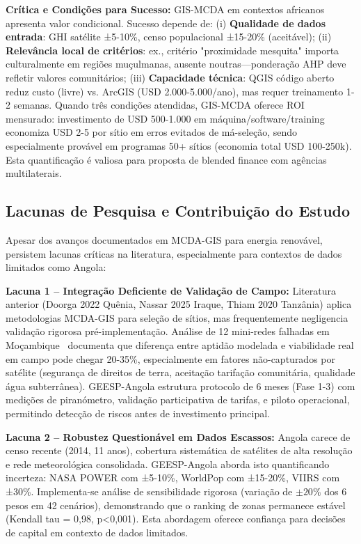 \documentclass[12pt, a4paper]{article}
\begin{document}
\noindent 
\textbf{Crítica e Condições para Sucesso:} GIS-MCDA em contextos africanos apresenta valor condicional. Sucesso depende de: (i) 
\textbf{Qualidade de dados entrada}: GHI satélite ±5-10\%, censo populacional ±15-20\% (aceitável); (ii) 
\textbf{Relevância local de critérios}: ex., critério "proximidade mesquita" importa culturalmente em regiões muçulmanas,  ausente noutras—ponderação AHP deve refletir valores comunitários; (iii) 
\textbf{Capacidade técnica}: QGIS código aberto reduz custo (livre) vs. ArcGIS (USD 2.000-5.000/ano), mas requer treinamento 1-2 semanas. Quando três condições atendidas, GIS-MCDA oferece ROI mensurado: investimento de USD 500-1.000 em máquina/software/training economiza USD 2-5 por sítio em erros evitados de má-seleção, sendo especialmente provável em programas 50+ sítios (economia total USD 100-250k). Esta quantificação é valiosa para proposta de blended finance com agências multilaterais.

\subsection{Lacunas de Pesquisa e Contribuição do Estudo}

Apesar dos avanços documentados em MCDA-GIS para energia renovável, persistem lacunas críticas na literatura, especialmente para contextos de dados limitados como Angola:

\textbf{Lacuna 1 -- Integração Deficiente de Validação de Campo:} Literatura anterior (Doorga 2022 Quênia, Nassar 2025 Iraque, Thiam 2020 Tanzânia) aplica metodologias MCDA-GIS para seleção de sítios, mas frequentemente negligencia validação rigorosa pré-implementação. Análise de 12 mini-redes falhadas em Moçambique~\citep{Ahlborg2014} documenta que diferença entre aptidão modelada e viabilidade real em campo pode chegar 20-35\%, especialmente em fatores não-capturados por satélite (segurança de direitos de terra, aceitação tarifação comunitária, qualidade água subterrânea). GEESP-Angola estrutura protocolo de 6 meses (Fase 1-3) com medições de piranómetro, validação participativa de tarifas, e piloto operacional, permitindo detecção de riscos antes de investimento principal.

\textbf{Lacuna 2 -- Robustez Questionável em Dados Escassos:} Angola carece de censo recente (2014, 11 anos), cobertura sistemática de satélites de alta resolução e rede meteorológica consolidada. GEESP-Angola aborda isto quantificando incerteza: NASA POWER com ±5-10\%, WorldPop com ±15-20\%, VIIRS com ±30\%. Implementa-se análise de sensibilidade rigorosa (variação de $\pm 20\%$ dos 6 pesos em 42 cenários), demonstrando que o ranking de zonas permanece estável (Kendall tau = 0,98, p<0,001). Esta abordagem oferece confiança para decisões de capital em contexto de dados limitados.
\end{document}
